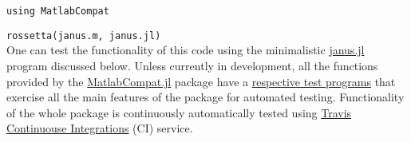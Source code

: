 \verb|using MatlabCompat|

\verb|rossetta(janus.m, janus.jl)|\\

One can test the functionality of this code using the minimalistic \href{https://github.com/MatlabCompat/MatlabCompat.jl/blob/master/test/janus.jl}{janus.jl} program discussed below. Unless currently in development, all the functions provided by the \href{https://github.com/MatlabCompat/MatlabCompat.jl}{MatlabCompat.jl} package have a \href{https://github.com/MatlabCompat/MatlabCompat.jl/tree/master/test}{respective test programs} that exercise all the main features of the package for automated testing. Functionality of the whole package is continuously automatically tested using \href{https://travis-ci.org/MatlabCompat/MatlabCompat.jl}{Travis Continuouse Integrations} (CI) service.
  
  
  